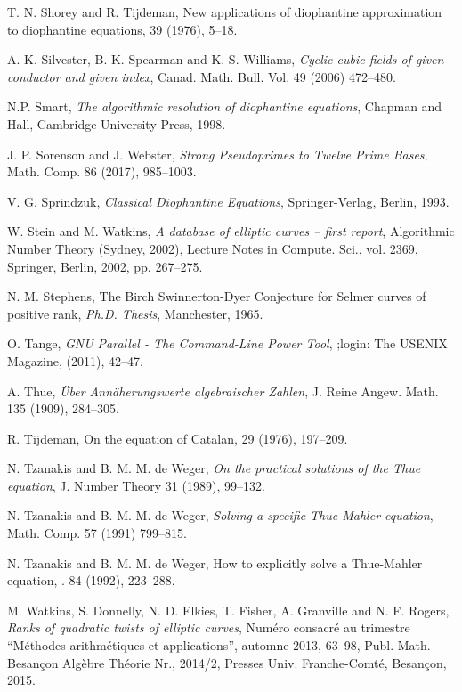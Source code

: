 \begin{thebibliography}{}
T. N. Shorey and R. Tijdeman,
\newblock New applications of diophantine approximation to diophantine equations,
 39 (1976), 5--18.

A. K. Silvester, B. K. Spearman and K. S. Williams,
\emph{Cyclic cubic fields of given conductor
and given index}, Canad. Math. Bull. Vol. 49 (2006)  472--480.

N.P. Smart, 
\emph{The algorithmic resolution of diophantine equations}, 
Chapman and Hall, Cambridge University Press, 1998.

 J. P. Sorenson and J. Webster, 
  \emph{Strong Pseudoprimes to Twelve 
Prime Bases}, Math. Comp. 86 (2017), 985--1003.

V. G. Sprindzuk,
\emph{Classical Diophantine Equations},
Springer-Verlag, Berlin, 1993.

W. Stein and M. Watkins,
\emph{A database of elliptic curves -- first report},
Algorithmic Number Theory (Sydney, 2002), Lecture Notes in Compute. Sci., vol. 2369, 
Springer, Berlin, 2002, pp. 267--275.
  
N. M. Stephens, 
The Birch Swinnerton-Dyer Conjecture for Selmer
curves of positive rank,
\emph{Ph.D. Thesis}, Manchester, 1965.

O. Tange,
\emph{GNU Parallel - The Command-Line Power Tool},
;login: The USENIX Magazine, (2011), 42--47.

A. Thue,
\emph{\"Uber Ann\"aherungswerte algebraischer Zahlen},
J. Reine Angew. Math. 135 (1909), 284--305.

R. Tijdeman,
\newblock On the equation of Catalan, 
 29 (1976), 197--209.

N. Tzanakis and B. M. M. de Weger,
\emph{On the practical solutions of the Thue equation},
J. Number Theory 31 (1989), 99--132.

N. Tzanakis and B. M. M. de Weger, 
\emph{Solving a specific Thue-Mahler equation},
Math. Comp. 57 (1991) 799--815.

N. Tzanakis and B. M. M. de Weger, 
\newblock How to explicitly solve a Thue-Mahler equation,
. 84 (1992), 223--288.

M. Watkins, S. Donnelly, N. D. Elkies, T. Fisher, A. Granville and N. F. Rogers, 
\emph{Ranks of quadratic twists of elliptic curves},
Num\'ero consacr\'e au trimestre ``M\'ethodes arithm\'etiques et applications'', automne 2013, 63--98, Publ. Math. Besan\c{c}on Alg\`ebre Th\'eorie Nr., 2014/2, Presses Univ. Franche-Comt\'e, Besan\c{c}on, 2015. 


\end{thebibliography}
